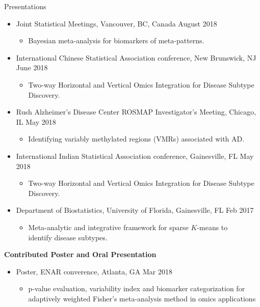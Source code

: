 \documentclass{resume} %
\begin{document}
\begin{rSection}{Presentations}
\begin{itemize}[noitemsep,topsep=0pt]
\item  Joint Statistical Meetings, Vancouver, BC, Canada  \hfill {August 2018}
\begin{itemize}[noitemsep,topsep=0pt]
\item{Bayesian meta-analysis for biomarkers of meta-patterns.}
\end{itemize}

\item  International Chinese Statistical Association conference, New Brunswick, NJ  \hfill {June 2018}
\begin{itemize}[noitemsep,topsep=0pt]
\item{Two-way Horizontal and Vertical Omics Integration for Disease Subtype Discovery.}
\end{itemize}


\item  Rush Alzheimer's Disease Center ROSMAP Investigator's Meeting, Chicago, IL  \hfill {May 2018}
\begin{itemize}[noitemsep,topsep=0pt]
\item{Identifying variably methylated regions (VMRs) associated with AD.}
\end{itemize}

\item  International Indian Statistical Association conference, Gainesville, FL \hfill {May 2018}
\begin{itemize}[noitemsep,topsep=0pt]
\item{Two-way Horizontal and Vertical Omics Integration for Disease Subtype Discovery.}
\end{itemize}

\item  Department of Biostatistics, University of Florida, Gainesville, FL \hfill {Feb 2017}
\begin{itemize}[noitemsep,topsep=0pt]
\item{Meta-analytic and integrative framework for sparse $K$-means to\\ identify disease subtypes.}
\end{itemize}


\end{itemize}


\textbf{Contributed Poster and Oral Presentation}

\begin{itemize}[noitemsep,topsep=0pt]


\item  Poster, ENAR converence, Atlanta, GA \hfill {Mar 2018}
\begin{itemize}[noitemsep,topsep=0pt]
\item{p-value evaluation, variability index and biomarker categorization for \\adaptively
weighted Fisher's meta-analysis method in omics applications}
\end{itemize}


\end{itemize}
\end{rSection}
\end{document}
